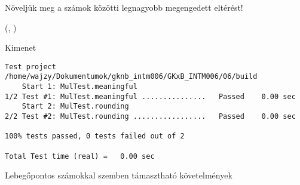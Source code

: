 \begin{frame}
  Növeljük meg a számok közötti legnagyobb megengedett eltérést!
  \begin{exampleblock}{ %
    (, %
     )}
    \footnotesize
    
  \end{exampleblock}
\end{frame}

\begin{frame}[fragile]
  \begin{block}{Kimenet}
    \scriptsize
    \begin{verbatim}
Test project /home/wajzy/Dokumentumok/gknb_intm006/GKxB_INTM006/06/build
    Start 1: MulTest.meaningful
1/2 Test #1: MulTest.meaningful ...............   Passed    0.00 sec
    Start 2: MulTest.rounding
2/2 Test #2: MulTest.rounding .................   Passed    0.00 sec

100% tests passed, 0 tests failed out of 2

Total Test time (real) =   0.00 sec
\end{verbatim}
  \end{block}
\end{frame}

\begin{frame}
  \begin{center}
    Lebegőpontos számokkal szemben támasztható követelmények
    \medskip\\
  \end{center}
\end{frame}
